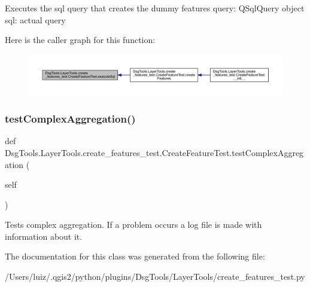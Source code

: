 \begin{DoxyVerb}Executes the sql query that creates the dummy features
query: QSqlQuery object
sql: actual query
\end{DoxyVerb}
 Here is the caller graph for this function\+:
\nopagebreak
\begin{figure}[H]
\begin{center}
\leavevmode
\includegraphics[width=350pt]{class_dsg_tools_1_1_layer_tools_1_1create__features__test_1_1_create_feature_test_a144d062e59edc0d33040b0acb30c2e5b_icgraph}
\end{center}
\end{figure}
\mbox{\label{class_dsg_tools_1_1_layer_tools_1_1create__features__test_1_1_create_feature_test_a9b4d7b19468f8bbe7e7ec64ad4e465cd}} 
\subsubsection{\texorpdfstring{test\+Complex\+Aggregation()}{testComplexAggregation()}}
{\footnotesize\ttfamily def Dsg\+Tools.\+Layer\+Tools.\+create\+\_\+features\+\_\+test.\+Create\+Feature\+Test.\+test\+Complex\+Aggregation (\begin{DoxyParamCaption}\item[{}]{self }\end{DoxyParamCaption})}

\begin{DoxyVerb}Tests complex aggregation. If a problem occurs a log file is made with information about it.
\end{DoxyVerb}
 

The documentation for this class was generated from the following file\+:\begin{DoxyCompactItemize}
\item 
/\+Users/luiz/.\+qgis2/python/plugins/\+Dsg\+Tools/\+Layer\+Tools/create\+\_\+features\+\_\+test.\+py\end{DoxyCompactItemize}
